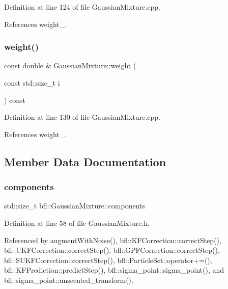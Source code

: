 Definition at line 124 of file Gaussian\+Mixture.\+cpp.



References weight\+\_\+.

\mbox{\label{classbfl_1_1GaussianMixture_a42672f88d9126f018715a4d258a57731}} 
\subsubsection{\texorpdfstring{weight()}{weight()}\hspace{0.1cm}{\footnotesize\ttfamily [4/4]}}
{\footnotesize\ttfamily const double \& Gaussian\+Mixture\+::weight (\begin{DoxyParamCaption}\item[{const std\+::size\+\_\+t}]{i }\end{DoxyParamCaption}) const}



Definition at line 130 of file Gaussian\+Mixture.\+cpp.



References weight\+\_\+.



\subsection{Member Data Documentation}
\mbox{\label{classbfl_1_1GaussianMixture_a02cc284327dbaa6b90c653dd2faccf88}} 
\subsubsection{\texorpdfstring{components}{components}}
{\footnotesize\ttfamily std\+::size\+\_\+t bfl\+::\+Gaussian\+Mixture\+::components}



Definition at line 58 of file Gaussian\+Mixture.\+h.



Referenced by augment\+With\+Noise(), bfl\+::\+K\+F\+Correction\+::correct\+Step(), bfl\+::\+U\+K\+F\+Correction\+::correct\+Step(), bfl\+::\+G\+P\+F\+Correction\+::correct\+Step(), bfl\+::\+S\+U\+K\+F\+Correction\+::correct\+Step(), bfl\+::\+Particle\+Set\+::operator+=(), bfl\+::\+K\+F\+Prediction\+::predict\+Step(), bfl\+::sigma\+\_\+point\+::sigma\+\_\+point(), and bfl\+::sigma\+\_\+point\+::unscented\+\_\+transform().

